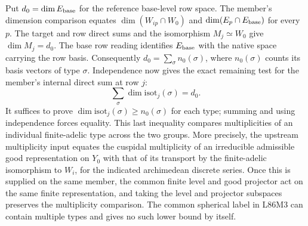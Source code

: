 Put $d_0=\dim E_{\rm base}$ for the reference base-level row space.
The member's dimension comparison equates
$\dim(W_{ip}\cap W_0)$ and $\dim(E_p\cap E_{\rm base})$ for every
$p$. The target and row direct sums and the isomorphism
$M_j\simeq W_0$ give $\dim M_j=d_0$. The base row reading identifies
$E_{\rm base}$ with the native space carrying the row basis. Consequently
$d_0=\sum_\sigma n_0(\sigma)$, where $n_0(\sigma)$ counts its basis
vectors of type $\sigma$. Independence now gives the exact remaining
test for the member's internal direct sum at row $j$:
\[
      \sum_\sigma\dim\mathrm{isot}_j(\sigma)=d_0 .
\]
It suffices to prove $\dim\mathrm{isot}_j(\sigma)\ge n_0(\sigma)$
for each type; summing and using independence forces equality. This
last inequality compares multiplicities of an individual
finite-adelic type across the two groups. More precisely, the upstream multiplicity input equates the cuspidal
multiplicity of an irreducible admissible good representation on
$Y_0$ with that of its transport by the finite-adelic isomorphism
to $W_i$, for the indicated archimedean discrete series. Once this
is supplied on the same member, the common finite level and good
projector act on the same finite representation, and taking the
level and projector subspaces preserves the multiplicity comparison.
The common spherical
label in L86M3 can contain multiple types and gives no such
lower bound by itself.
